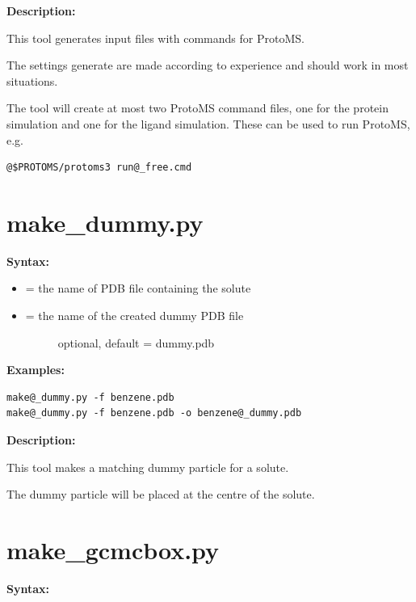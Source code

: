 \documentclass[letterpaper,10pt,english]{manual}
\begin{document}
\textbf{Description:}

This tool generates input files with commands for ProtoMS.

The settings generate are made according to experience and should work in most situations.

The tool will create at most two ProtoMS command files, one for the protein simulation and one for the ligand simulation. These can be used to run ProtoMS, e.g.

\begin{Verbatim}[commandchars=@\[\]]
@$PROTOMS/protoms3 run@_free.cmd
\end{Verbatim}


\section{make\_dummy.py}

\textbf{Syntax:}

\begin{itemize}
\item {} 
 = the name of PDB file containing the solute

\item {} \begin{description}
\item[{ = the name of the created dummy PDB file}] \leavevmode
optional, default = dummy.pdb

\end{description}

\end{itemize}

\textbf{Examples:}

\begin{Verbatim}[commandchars=@\[\]]
make@_dummy.py -f benzene.pdb
make@_dummy.py -f benzene.pdb -o benzene@_dummy.pdb
\end{Verbatim}

\textbf{Description:}

This tool makes a matching dummy particle for a solute.

The dummy particle will be placed at the centre of the solute.


\section{make\_gcmcbox.py}

\textbf{Syntax:}
\end{document}
